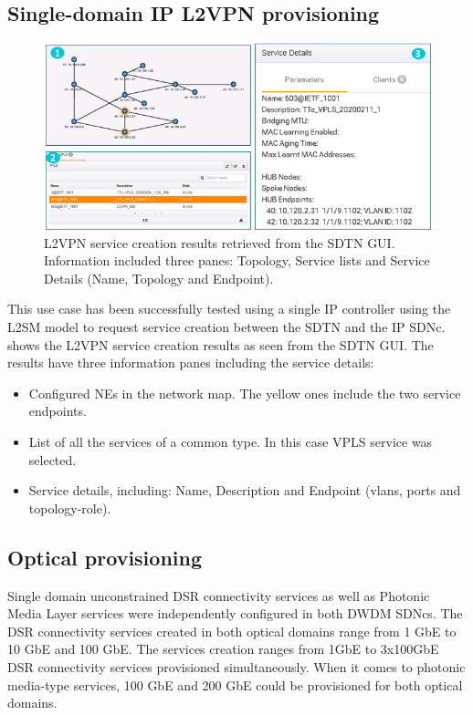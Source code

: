 \documentclass[a4paper,fleqn]{cas-dc}
\begin{document}
\subsection{Single-domain IP L2VPN provisioning}

\begin{figure}
	\centering
		\includegraphics[width=\linewidth]{figs/l2vpn_results_2.png}
	\caption{L2VPN service creation results retrieved from the SDTN GUI. Information included three panes: Topology, Service lists and Service Details (Name, Topology and Endpoint).}
	\label{FIG:L2SM_results}
\end{figure}

This use case has been successfully tested using a single IP controller using the L2SM model to request service creation between the SDTN and the IP SDNc.  shows the L2VPN service creation results as seen from the SDTN GUI. The results have three information panes including the service details: 
\begin{itemize}
    \item Configured NEs in the network map. The yellow ones include the two service endpoints.
    \item List of all the services of a common type. In this case VPLS service was selected. 
    \item Service details, including: Name, Description and Endpoint (vlans, ports and topology-role). 
\end{itemize}

\subsection{Optical provisioning}

Single domain unconstrained DSR connectivity services as well as Photonic Media Layer services were independently configured in both DWDM SDNcs.  The DSR connectivity services created in both optical domains range from 1 GbE to 10 GbE and 100 GbE. The services creation ranges from 1GbE to 3x100GbE DSR connectivity services provisioned simultaneously. When it comes to photonic media-type services, 100 GbE and 200 GbE could be provisioned for both optical domains. 
\end{document}

